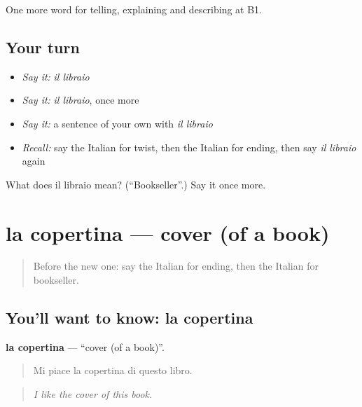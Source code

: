 \begin{grammarlens}[title={What you've built}]
One more word for telling, explaining and describing at B1.
\end{grammarlens}

\subsection*{Your turn}
\begin{itemize}
\raggedright
  \item \emph{Say it:} \emph{il libraio}
  \item \emph{Say it:} \emph{il libraio}, once more
  \item \emph{Say it:} a sentence of your own with \emph{il libraio}
  \item \emph{Recall:} say the Italian for twist, then the Italian for ending, then say \emph{il libraio} again
\end{itemize}

\begin{tcolorbox}[breakable,colback=teal!4,colframe=teal!35!black,title={Before you move on}]
What does il libraio mean? (\textquotedblleft{}Bookseller\textquotedblright{}.) Say it once more.
\end{tcolorbox}
\section[la copertina]{la copertina — cover (of a book)}

\label{lesson:IT-C525-copertina}



\begin{quote}
Before the new one: say the Italian for ending, then the Italian for bookseller.
\end{quote}

\subsection*{You'll want to know: la copertina}
\textbf{la copertina} — \textquotedblleft{}cover (of a book)\textquotedblright{}.

\begin{quote}
Mi piace la copertina di questo libro.
\end{quote}

\begin{quote}
\emph{I like the cover of this book.}
\end{quote}

